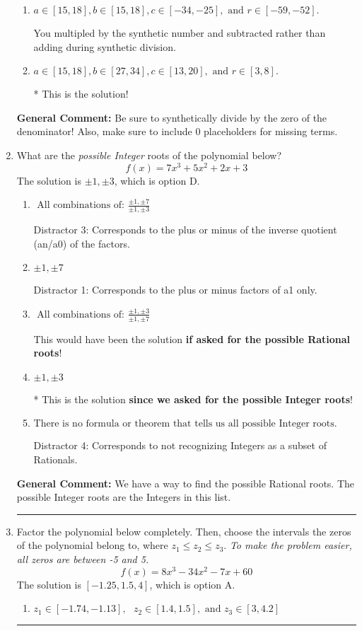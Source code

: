 \documentclass{extbook}[14pt]
\newcommand{\litem}[1]{\item #1

\rule{\textwidth}{0.4pt}}
\begin{document}
\begin{enumerate}
{\begin{enumerate}[label=\Alph*.]
 You multipled by the synthetic number rather than bringing the first factor down.
\item \( a \in [15, 18], b \in [15, 18], c \in [-34, -25], \text{ and } r \in [-59, -52]. \)

 You multipled by the synthetic number and subtracted rather than adding during synthetic division.
\item \( a \in [15, 18], b \in [27, 34], c \in [13, 20], \text{ and } r \in [3, 8]. \)

* This is the solution!
\end{enumerate}

\textbf{General Comment:} Be sure to synthetically divide by the zero of the denominator! Also, make sure to include 0 placeholders for missing terms.
}
\litem{
What are the \textit{possible Integer} roots of the polynomial below?
\[ f(x) = 7x^{3} +5 x^{2} +2 x + 3 \]The solution is \( \pm 1,\pm 3 \), which is option D.\begin{enumerate}[label=\Alph*.]
\item \( \text{ All combinations of: }\frac{\pm 1,\pm 7}{\pm 1,\pm 3} \)

 Distractor 3: Corresponds to the plus or minus of the inverse quotient (an/a0) of the factors. 
\item \( \pm 1,\pm 7 \)

 Distractor 1: Corresponds to the plus or minus factors of a1 only.
\item \( \text{ All combinations of: }\frac{\pm 1,\pm 3}{\pm 1,\pm 7} \)

This would have been the solution \textbf{if asked for the possible Rational roots}!
\item \( \pm 1,\pm 3 \)

* This is the solution \textbf{since we asked for the possible Integer roots}!
\item \( \text{There is no formula or theorem that tells us all possible Integer roots.} \)

 Distractor 4: Corresponds to not recognizing Integers as a subset of Rationals.
\end{enumerate}

\textbf{General Comment:} We have a way to find the possible Rational roots. The possible Integer roots are the Integers in this list.
}
\litem{
Factor the polynomial below completely. Then, choose the intervals the zeros of the polynomial belong to, where $z_1 \leq z_2 \leq z_3$. \textit{To make the problem easier, all zeros are between -5 and 5.}
\[ f(x) = 8x^{3} -34 x^{2} -7 x + 60 \]The solution is \( [-1.25, 1.5, 4] \), which is option A.\begin{enumerate}[label=\Alph*.]
\item \( z_1 \in [-1.74, -1.13], \text{   }  z_2 \in [1.4, 1.5], \text{   and   } z_3 \in [3, 4.2] \)


\end{enumerate}}
\end{enumerate}
\end{document}
